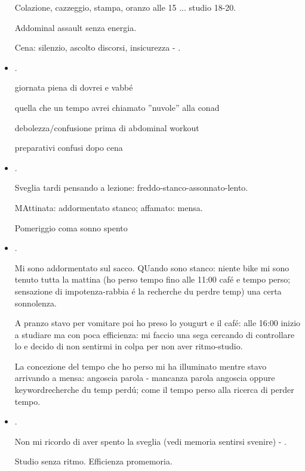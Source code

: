 \begin{itemize}
Colazione, cazzeggio, stampa, oranzo alle 15 ... studio 18-20.

Addominal assault senza energia.

Cena: silenzio, ascolto discorsi, insicurezza - .

\item {}.

giornata piena di dovrei e vabb\'e

quella che un tempo avrei chiamato ''nuvole'' alla conad

debolezza/confusione prima di abdominal workout

preparativi confusi dopo cena

\item {}.

Sveglia tardi pensando a lezione: freddo-stanco-assonnato-lento.

MAttinata: addormentato stanco; affamato: mensa.

Pomeriggio coma sonno spento

\item {}.

Mi sono addormentato sul sacco. QUando  sono stanco: niente bike mi sono tenuto tutta la mattina (ho perso tempo fino alle 11:00 caf\'e e tempo perso; sensazione di impotenza-rabbia \'e la recherche du perdre temp) una certa sonnolenza.

A pranzo stavo per vomitare poi ho preso lo yougurt e il caf\'e: alle 16:00 inizio a studiare ma con poca efficienza: mi faccio una sega cercando di controllare lo  e decido di non sentirmi in colpa per non aver ritmo-studio. 

La concezione del tempo che ho perso mi ha illuminato mentre stavo arrivando a mensa: angoscia parola - mancanza parola angoscia oppure keyword{recherche du temp perd\'u}; come il tempo perso alla ricerca di perder tempo.

\item {}.

Non mi ricordo di aver spento la sveglia (vedi memoria sentirsi svenire) - .

Studio senza ritmo. Efficienza promemoria.




\end{itemize}
